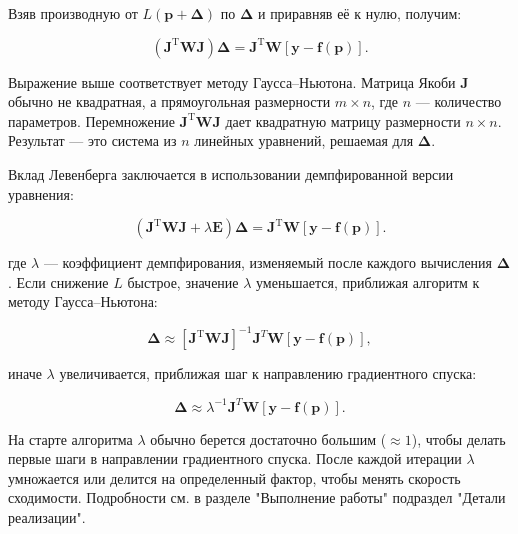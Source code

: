 Взяв производную от $L\left ( \mathbf{p} + \boldsymbol\Delta\right )$ по $\boldsymbol{\Delta}$ и приравняв её к нулю, получим:

$$
	\left (\mathbf J^{\mathrm T} \boldsymbol{W} \mathbf J \right ) \boldsymbol\Delta = \mathbf J^{\mathrm T}\boldsymbol{W}\left [\mathbf y - \mathbf f\left ( \boldsymbol p\right )\right ].
$$


Выражение выше соответствует методу Гаусса–Ньютона. Матрица Якоби $\mathbf{J}$ обычно не квадратная, а прямоугольная размерности $m \times n$, где $n$ — количество параметров. Перемножение $\mathbf J^{\mathrm T} \boldsymbol{W} \mathbf J$ дает квадратную матрицу размерности $n \times n$. Результат — это система из $n$ линейных уравнений, решаемая для $\boldsymbol{\Delta}$.

Вклад Левенберга заключается в использовании демпфированной версии уравнения:

$$
	\left (\mathbf J^{\mathrm T} \boldsymbol{W} \mathbf J + \lambda \mathbf{E} \right ) \boldsymbol\Delta = \mathbf J^{\mathrm T}\boldsymbol{W}\left [\mathbf y - \mathbf f\left ( \boldsymbol p\right )\right ].
$$

где $\lambda$ — коэффициент демпфирования, изменяемый после каждого вычисления $\boldsymbol{\Delta}$. Если снижение $L$ быстрое, значение $\lambda$ уменьшается, приближая алгоритм к методу Гаусса–Ньютона:

$$
	\boldsymbol{\Delta}\approx[\mathbf J^{\mathrm T} \boldsymbol{W} \mathbf J]^{-1}\mathbf{J}^{T}\boldsymbol{W}[\mathbf y - \mathbf f\left ( \mathbf{p}\right )],
$$

иначе $\lambda$ увеличивается, приближая шаг к направлению градиентного спуска:

$$
	\boldsymbol{\Delta}\approx\lambda^{-1}\mathbf{J}^{T}\boldsymbol{W}[\mathbf y - \mathbf f\left ( \mathbf{p}\right )].
$$

На старте алгоритма $\lambda$ обычно берется достаточно большим ($\approx 1$), чтобы делать первые шаги в направлении градиентного спуска. После каждой итерации $\lambda$ умножается или делится на определенный фактор, чтобы менять скорость сходимости.
Подробности см. в разделе "Выполнение работы"  подраздел "Детали реализации".

\newpage